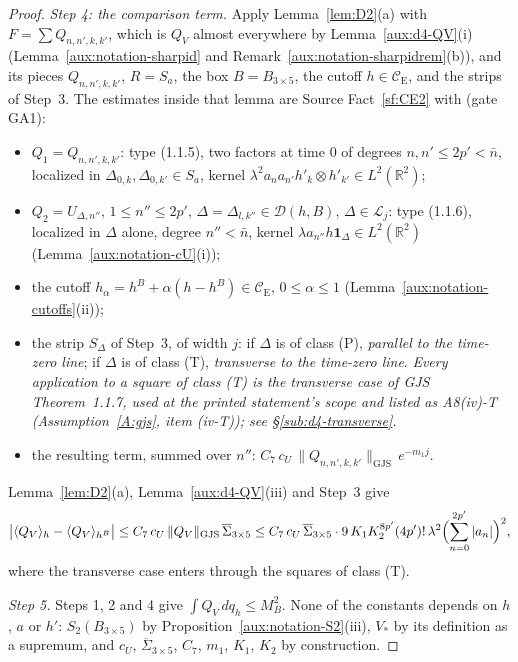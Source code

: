 \documentclass[11pt,a4paper]{article}
\theoremstyle{plain}
\theoremstyle{definition}
\theoremstyle{plain}
\theoremstyle{definition}
\newcommand{\R}{\mathbb{R}}
\newcommand{\CE}{\mathcal{C}_{\mathrm E}}
\newcommand{\GJS}[1]{\lVert #1\rVert_{\mathrm{GJS}}}   %
\newcommand{\ev}[2]{\langle #1\rangle_{#2}}            %
\begin{document}
\begin{proof}
\emph{Step 4: the comparison term.}  Apply Lemma~\ref{lem:D2}(a) with $F=\sum Q_{n,n',k,k'}$, which
is $Q_V$ almost everywhere by Lemma~\ref{aux:d4-QV}(i) (Lemma~\ref{aux:notation-sharpid} and
Remark~\ref{aux:notation-sharpidrem}(b)),
and its pieces $Q_{n,n',k,k'}$, $R=S_a$, the box $B=B_{3\times5}$, the cutoff $h\in\CE$, and the
strips of Step~3.  The estimates inside that lemma are Source Fact~\ref{sf:CE2} with (gate
GA1):
\begin{itemize}
\item $Q_1=Q_{n,n',k,k'}$: type (1.1.5), two factors at time $0$ of degrees $n,n'\le2p'<\bar n$,
  localized in $\Delta_{0,k},\Delta_{0,k'}\in S_a$, kernel
  $\lambda^2a_na_{n'}h'_k\otimes h'_{k'}\in L^2(\R^2)$;
\item $Q_2=U_{\Delta,n''}$, $1\le n''\le2p'$, $\Delta=\Delta_{l,k''}\in\mathcal D(h,B)$, $\Delta\in
  \mathcal L_j$: type (1.1.6), localized in $\Delta$ alone, degree $n''<\bar n$, kernel
  $\lambda a_{n''}h\mathbf 1_\Delta\in L^2(\R^2)$ (Lemma~\ref{aux:notation-cU}(i));
\item the cutoff $h_\alpha=h^B+\alpha(h-h^B)\in\CE$, $0\le\alpha\le1$
  (Lemma~\ref{aux:notation-cutoffs}(ii));
\item the strip $S_\Delta$ of Step~3, of width $j$: if $\Delta$ is of class (P), \emph{parallel to
  the time-zero line}; if $\Delta$ is of class (T), \emph{transverse to the time-zero line}.
  \emph{Every application to a square of class (T) is the transverse case of GJS
  Theorem~1.1.7, used at the printed statement's scope and listed as A8(iv)-T
  (Assumption~\ref{A:gjs}, item (iv-T)); see \S\ref{sub:d4-transverse}.}
\item the resulting term, summed over $n''$: $C_7\,c_U\,\GJS{Q_{n,n',k,k'}}\,e^{-m_1j}$.
\end{itemize}
Lemma~\ref{lem:D2}(a), Lemma~\ref{aux:d4-QV}(iii) and Step~3 give
\[
 \bigl|\ev{Q_V}{h}-\ev{Q_V}{h^B}\bigr|\le C_7\,c_U\,\GJS{Q_V}\,\overline\Sigma_{3\times5}
 \le C_7\,c_U\,\overline\Sigma_{3\times5}\cdot9\,K_1K_2^{8p'}(4p')!\,\lambda^2
 \Bigl(\sum_{n=0}^{2p'}|a_n|\Bigr)^2 ,
\]
where the transverse case enters through the squares of class (T).

\emph{Step 5.}  Steps 1, 2 and 4 give $\int Q_V\,dq_h\le M_B^2$.  None of the constants depends on
$h$, $a$ or $h'$: $S_2(B_{3\times5})$ by Proposition~\ref{aux:notation-S2}(iii), $V_*$ by its
definition as a supremum, and $c_U$, $\overline\Sigma_{3\times5}$, $C_7$, $m_1$, $K_1$, $K_2$ by
construction.
\end{proof}
\end{document}
